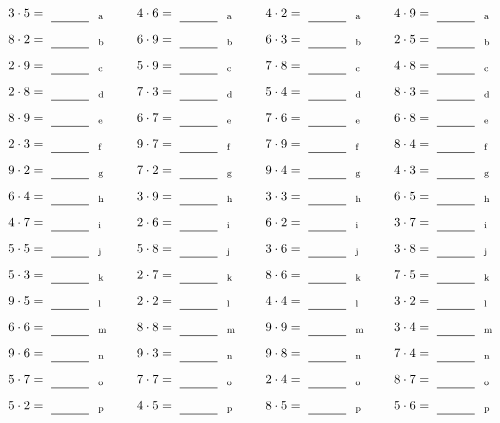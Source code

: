 \documentclass
[
  draft    = true,
  fontsize = 11pt,
  parskip  = half-
]
{scrartcl}
\begin{document}
\par\vfill\par
\begin{align*}
    \pline{3\cdot5}&=\rline{a}
  & \pline{4\cdot6}&=\rline{a}
  & \pline{4\cdot2}&=\rline{a}
  & \pline{4\cdot9}&=\rline{a} \\[1ex]
    \pline{8\cdot2}&=\rline{b}
  & \pline{6\cdot9}&=\rline{b}
  & \pline{6\cdot3}&=\rline{b}
  & \pline{2\cdot5}&=\rline{b} \\[1ex]
    \pline{2\cdot9}&=\rline{c}
  & \pline{5\cdot9}&=\rline{c}
  & \pline{7\cdot8}&=\rline{c}
  & \pline{4\cdot8}&=\rline{c} \\[1ex]
    \pline{2\cdot8}&=\rline{d}
  & \pline{7\cdot3}&=\rline{d}
  & \pline{5\cdot4}&=\rline{d}
  & \pline{8\cdot3}&=\rline{d} \\[1ex]
    \pline{8\cdot9}&=\rline{e}
  & \pline{6\cdot7}&=\rline{e}
  & \pline{7\cdot6}&=\rline{e}
  & \pline{6\cdot8}&=\rline{e} \\[1ex]
    \pline{2\cdot3}&=\rline{f}
  & \pline{9\cdot7}&=\rline{f}
  & \pline{7\cdot9}&=\rline{f}
  & \pline{8\cdot4}&=\rline{f} \\[1ex]
    \pline{9\cdot2}&=\rline{g}
  & \pline{7\cdot2}&=\rline{g}
  & \pline{9\cdot4}&=\rline{g}
  & \pline{4\cdot3}&=\rline{g} \\[1ex]
    \pline{6\cdot4}&=\rline{h}
  & \pline{3\cdot9}&=\rline{h}
  & \pline{3\cdot3}&=\rline{h}
  & \pline{6\cdot5}&=\rline{h} \\[1ex]
    \pline{4\cdot7}&=\rline{i}
  & \pline{2\cdot6}&=\rline{i}
  & \pline{6\cdot2}&=\rline{i}
  & \pline{3\cdot7}&=\rline{i} \\[1ex]
    \pline{5\cdot5}&=\rline{j}
  & \pline{5\cdot8}&=\rline{j}
  & \pline{3\cdot6}&=\rline{j}
  & \pline{3\cdot8}&=\rline{j} \\[1ex]
    \pline{5\cdot3}&=\rline{k}
  & \pline{2\cdot7}&=\rline{k}
  & \pline{8\cdot6}&=\rline{k}
  & \pline{7\cdot5}&=\rline{k} \\[1ex]
    \pline{9\cdot5}&=\rline{l}
  & \pline{2\cdot2}&=\rline{l}
  & \pline{4\cdot4}&=\rline{l}
  & \pline{3\cdot2}&=\rline{l} \\[1ex]
    \pline{6\cdot6}&=\rline{m}
  & \pline{8\cdot8}&=\rline{m}
  & \pline{9\cdot9}&=\rline{m}
  & \pline{3\cdot4}&=\rline{m} \\[1ex]
    \pline{9\cdot6}&=\rline{n}
  & \pline{9\cdot3}&=\rline{n}
  & \pline{9\cdot8}&=\rline{n}
  & \pline{7\cdot4}&=\rline{n} \\[1ex]
    \pline{5\cdot7}&=\rline{o}
  & \pline{7\cdot7}&=\rline{o}
  & \pline{2\cdot4}&=\rline{o}
  & \pline{8\cdot7}&=\rline{o} \\[1ex]
    \pline{5\cdot2}&=\rline{p}
  & \pline{4\cdot5}&=\rline{p}
  & \pline{8\cdot5}&=\rline{p}
  & \pline{5\cdot6}&=\rline{p}
\end{align*}
\end{document}
